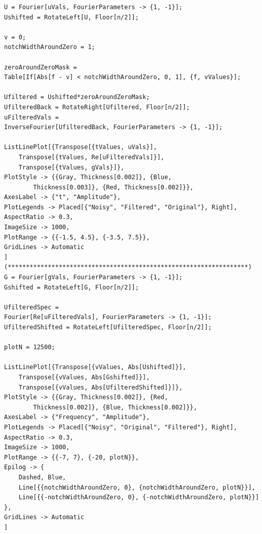 \documentclass[a4paper,12pt]{article}
\begin{document}
\begin{lstlisting}[caption={Фильтрация высоких частот. Отрисовка сигналов и фурье-образов}]
U = Fourier[uVals, FourierParameters -> {1, -1}];
Ushifted = RotateLeft[U, Floor[n/2]];

v = 0;
notchWidthAroundZero = 1;

zeroAroundZeroMask = 
Table[If[Abs[f - v] < notchWidthAroundZero, 0, 1], {f, vValues}];

Ufiltered = Ushifted*zeroAroundZeroMask;
UfilteredBack = RotateRight[Ufiltered, Floor[n/2]];
uFilteredVals = 
InverseFourier[UfilteredBack, FourierParameters -> {1, -1}];

ListLinePlot[{Transpose[{tValues, uVals}], 
	Transpose[{tValues, Re[uFilteredVals]}], 
	Transpose[{tValues, gVals}]},
PlotStyle -> {{Gray, Thickness[0.002]}, {Blue, 
		Thickness[0.003]}, {Red, Thickness[0.002]}},
AxesLabel -> {"t", "Amplitude"},
PlotLegends -> Placed[{"Noisy", "Filtered", "Original"}, Right],
AspectRatio -> 0.3,
ImageSize -> 1000,
PlotRange -> {{-1.5, 4.5}, {-3.5, 7.5}}, 
GridLines -> Automatic
]
(******************************************************************)
G = Fourier[gVals, FourierParameters -> {1, -1}];
Gshifted = RotateLeft[G, Floor[n/2]];

UfilteredSpec = 
Fourier[Re[uFilteredVals], FourierParameters -> {1, -1}];
UfilteredShifted = RotateLeft[UfilteredSpec, Floor[n/2]];

plotN = 12500;

ListLinePlot[{Transpose[{vValues, Abs[Ushifted]}], 
	Transpose[{vValues, Abs[Gshifted]}], 
	Transpose[{vValues, Abs[UfilteredShifted]}]}, 
PlotStyle -> {{Gray, Thickness[0.002]}, {Red, 
		Thickness[0.002]}, {Blue, Thickness[0.002]}},
AxesLabel -> {"Frequency", "Amplitude"},
PlotLegends -> Placed[{"Noisy", "Original", "Filtered"}, Right],
AspectRatio -> 0.3,
ImageSize -> 1000,
PlotRange -> {{-7, 7}, {-20, plotN}}, 
Epilog -> {
	Dashed, Blue,
	Line[{{notchWidthAroundZero, 0}, {notchWidthAroundZero, plotN}}],
	Line[{{-notchWidthAroundZero, 0}, {-notchWidthAroundZero, plotN}}]
},
GridLines -> Automatic
]
\end{lstlisting}
\end{document}
